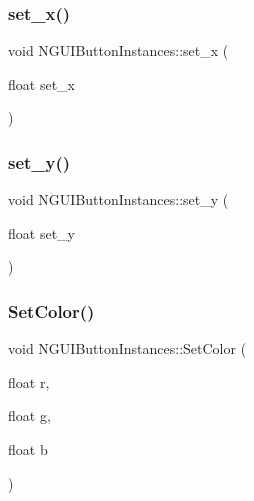\hypertarget{class_n_g_u_i_button_instances_ac87a6251da8ce8d8337cb448e574be16}{}\label{class_n_g_u_i_button_instances_ac87a6251da8ce8d8337cb448e574be16} 
\subsubsection{\texorpdfstring{set\+\_\+x()}{set\_x()}}
{\footnotesize\ttfamily void N\+G\+U\+I\+Button\+Instances\+::set\+\_\+x (\begin{DoxyParamCaption}\item[{float}]{set\+\_\+x }\end{DoxyParamCaption})}

\hypertarget{class_n_g_u_i_button_instances_ac5a3b8b4691738e1df75c47ae9a24c31}{}\label{class_n_g_u_i_button_instances_ac5a3b8b4691738e1df75c47ae9a24c31} 
\subsubsection{\texorpdfstring{set\+\_\+y()}{set\_y()}}
{\footnotesize\ttfamily void N\+G\+U\+I\+Button\+Instances\+::set\+\_\+y (\begin{DoxyParamCaption}\item[{float}]{set\+\_\+y }\end{DoxyParamCaption})}

\hypertarget{class_n_g_u_i_button_instances_a1e7d74e9ab5fceb80c5056905b99c0c4}{}\label{class_n_g_u_i_button_instances_a1e7d74e9ab5fceb80c5056905b99c0c4} 
\subsubsection{\texorpdfstring{Set\+Color()}{SetColor()}\hspace{0.1cm}{\footnotesize\ttfamily [1/2]}}
{\footnotesize\ttfamily void N\+G\+U\+I\+Button\+Instances\+::\+Set\+Color (\begin{DoxyParamCaption}\item[{float}]{r,  }\item[{float}]{g,  }\item[{float}]{b }\end{DoxyParamCaption})}


